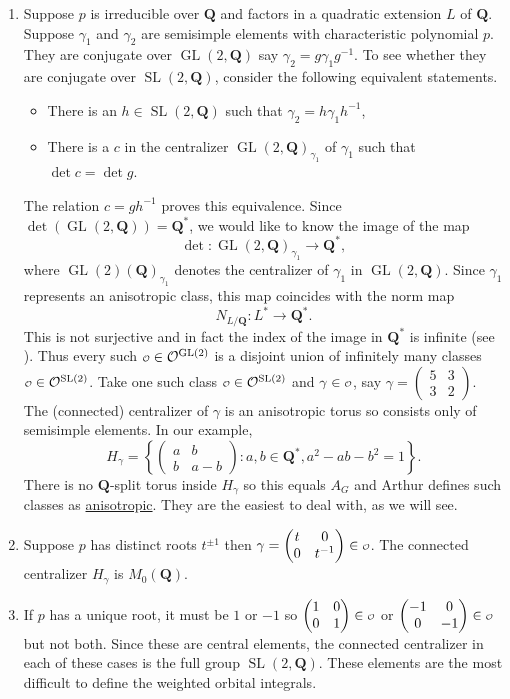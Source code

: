 \documentclass[11pt]{amsart}
\def\Q{\mathbf Q}
\def\O{\mathcal O}
\def\o{\scalebox{0.8}{$\scriptstyle\mathcal{O}$}}
\def\det{\operatorname{det}}
\def\gl{\operatorname{GL}}
\def\sl{\operatorname{SL}}
\theoremstyle{remark}
\begin{document}
\begin{enumerate}
	\item Suppose $p$ is irreducible over $\Q$ and factors in a quadratic extension $L$ of $\Q$. Suppose $\gamma_1$ and $\gamma_2$ are semisimple elements with characteristic polynomial $p$. They are conjugate over $\gl(2, \Q)$ say $\gamma_2 = g \gamma_1 g^{-1}$. To see whether they are conjugate over $\sl(2, \Q)$, consider the following equivalent statements. 
	\begin{itemize}
		\item There is an $h \in \sl(2, \Q)$ such that $\gamma_2 = h \gamma_1 h^{-1}$,
		\item There is a $c$ in the centralizer $\gl(2, \Q)_{\gamma_1}$ of $\gamma_1$ such that $\det c = \det g$. 
	\end{itemize}
		The relation $c = gh^{-1}$ proves this equivalence. Since $\det(\gl(2, \Q)) = \Q^*$, we would like to know the image of the map
    		\[ \det : \gl(2, \Q)_{\gamma_1} \to \Q^*, \]
		where $\gl(2)(\Q)_{\gamma_1}$ denotes the centralizer of $\gamma_1$ in $\gl(2, \Q)$. Since $\gamma_1$ represents an anisotropic class, this map coincides with the norm map
		\[ N_{L/\Q} : L^* \to \Q^*. \]
		This is not surjective and in fact the index of the image in $\Q^*$ is infinite (see \cite{MR1068677}). Thus every such $\o \in \O^{\gl(2)}$ is a disjoint union of infinitely many classes $\o \in \O^{\sl(2)}$. Take one such class $\o \in \O^{\sl(2)}$ and $\gamma \in \o$, say $\gamma = \begin{pmatrix} 5 & 3 \\ 3 & 2 \end{pmatrix}$. The (connected) centralizer of $\gamma$ is an anisotropic torus so consists only of semisimple elements. In our example, 
		\[ H_\gamma = \left\{ \begin{pmatrix} a & b \\ b & a - b \end{pmatrix} : a, b \in \Q^*, a^2 - ab - b^2 = 1 \right\}. \]
		There is no $\Q$-split torus inside $H_\gamma$ so this equals $A_G$ and Arthur defines such classes as \underline{anisotropic}. They are the easiest to deal with, as we will see. 
	\item Suppose $p$ has distinct roots $t^{\pm 1}$ then $\gamma = \begin{pmatrix} t & 0 \\ 0 & t^{-1} \end{pmatrix} \in \o$. The connected centralizer $H_\gamma$ is $M_0(\Q)$. 
	\item If $p$ has a unique root, it must be $1$ or $-1$ so $\begin{pmatrix} 1 & 0 \\ 0 & 1 \end{pmatrix} \in \o$ or $\begin{pmatrix} -1 & 0 \\ 0 & -1 \end{pmatrix} \in \o$ but not both. Since these are central elements, the connected centralizer in each of these cases is the full group $\sl(2, \Q)$. These elements are the most difficult to define the weighted orbital integrals. 
\end{enumerate}
\end{document}
